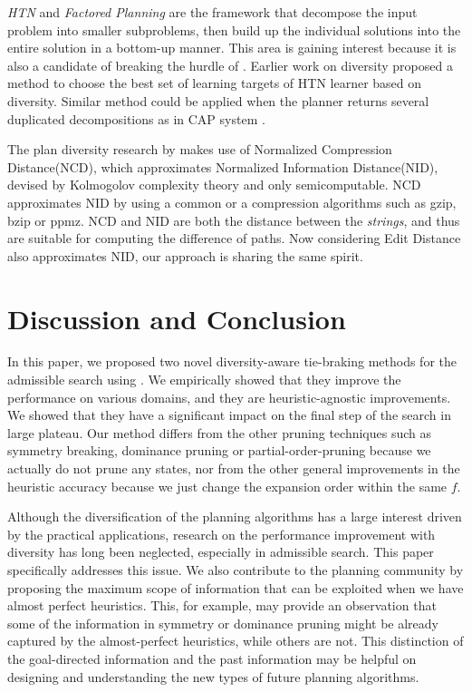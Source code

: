 \emph{HTN} \cite{erol1994} and \emph{Factored Planning} \cite{amir2003factored,brafman2006factored,Asai2015} are the framework that decompose the input problem into smaller subproblems, then build up the individual solutions into the entire solution in a bottom-up manner. This area is gaining interest because it is also a candidate of breaking the hurdle of \astar. Earlier work on diversity \cite{goldman2015measuring} proposed a method to choose the best set of learning targets of HTN learner based on diversity. Similar method could be applied when the planner returns several duplicated decompositions as in CAP system \cite{Asai2015}.

The plan diversity research by \cite{goldman2015measuring} makes use of Normalized Compression Distance(NCD), which approximates Normalized Information Distance(NID), devised by Kolmogolov complexity theory and only semicomputable. NCD approximates NID by using a common or a \sota compression algorithms such as gzip, bzip or ppmz. NCD and NID are both the distance between the  \emph{strings}, and thus are suitable for computing the difference of paths. Now considering Edit Distance also approximates NID\cite{someone}, our approach is sharing the same spirit.

\section{Discussion and Conclusion}

In this paper, we proposed two novel diversity-aware tie-braking methods for the admissible search using \astar. We empirically showed that they improve the performance on various domains, and they are heuristic-agnostic improvements. We showed that they have a significant impact on the final step of the search in large plateau.
Our method differs from the other pruning techniques such as symmetry breaking, dominance pruning or partial-order-pruning because we actually do not prune any states, nor from the other general improvements in the heuristic accuracy because we just change the expansion order within the same $f$.

Although the diversification of the planning algorithms has a large interest driven by the practical applications, research on the performance improvement with diversity has long been neglected, especially in admissible search. This paper specifically addresses this issue. We also  contribute to the planning community by proposing the maximum scope of information that can be exploited when we have almost perfect heuristics. This, for example, may provide an observation that some of the information in symmetry or dominance pruning might be already captured by the almost-perfect heuristics, while others are not. This distinction of the goal-directed information and the past information may be helpful on designing and understanding the new types of future planning algorithms.

